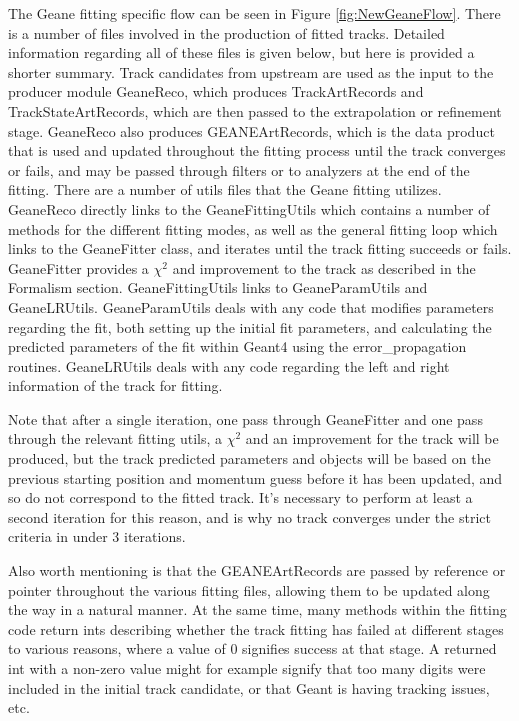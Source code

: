\documentclass{article}
\begin{document}
    The Geane fitting specific flow can be seen in Figure \ref{fig:NewGeaneFlow}. There is a number of files involved in the production of fitted tracks. Detailed information regarding all of these files is given below, but here is provided a shorter summary. Track candidates from upstream are used as the input to the producer module GeaneReco, which produces TrackArtRecords and TrackStateArtRecords, which are then passed to the extrapolation or refinement stage. GeaneReco also produces GEANEArtRecords, which is the data product that is used and updated throughout the fitting process until the track converges or fails, and may be passed through filters or to analyzers at the end of the fitting. There are a number of utils files that the Geane fitting utilizes. GeaneReco directly links to the GeaneFittingUtils which contains a number of methods for the different fitting modes, as well as the general fitting loop which links to the GeaneFitter class, and iterates until the track fitting succeeds or fails. GeaneFitter provides a $\chi^{2}$ and improvement to the track as described in the Formalism section. GeaneFittingUtils links to GeaneParamUtils and GeaneLRUtils. GeaneParamUtils deals with any code that modifies parameters regarding the fit, both setting up the initial fit parameters, and calculating the predicted parameters of the fit within Geant4 using the error\_propagation routines. GeaneLRUtils deals with any code regarding the left and right information of the track for fitting.
    
    Note that after a single iteration, one pass through GeaneFitter and one pass through the relevant fitting utils, a $\chi^{2}$ and an improvement for the track will be produced, but the track predicted parameters and objects will be based on the previous starting position and momentum guess before it has been updated, and so do not correspond to the fitted track. It's necessary to perform at least a second iteration for this reason, and is why no track converges under the strict criteria in under 3 iterations.

    Also worth mentioning is that the GEANEArtRecords are passed by reference or pointer throughout the various fitting files, allowing them to be updated along the way in a natural manner. At the same time, many methods within the fitting code return ints describing whether the track fitting has failed at different stages to various reasons, where a value of 0 signifies success at that stage. A returned int with a non-zero value might for example signify that too many digits were included in the initial track candidate, or that Geant is having tracking issues, etc.
\end{document}
